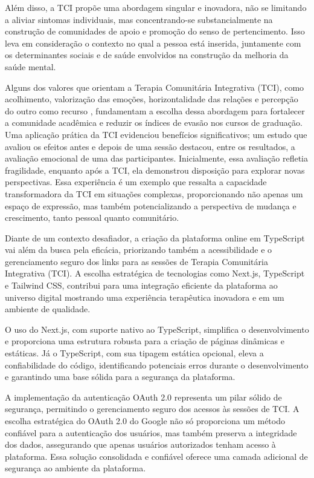 Além disso, a TCI propõe uma abordagem singular e inovadora, não se limitando a aliviar sintomas individuais, mas concentrando-se substancialmente na construção de comunidades de apoio e promoção do senso de pertencimento.\cite{BARRETO} Isso leva em consideração o contexto no qual a pessoa está inserida, juntamente com os determinantes sociais e de saúde envolvidos na construção da melhoria da saúde mental.

Alguns dos valores que orientam a Terapia Comunitária Integrativa (TCI), como acolhimento, valorização das emoções, horizontalidade das relações e percepção do outro como recurso  \cite{SILVA}, fundamentam a escolha dessa abordagem para fortalecer a comunidade acadêmica e reduzir os índices de evasão nos cursos de graduação. Uma aplicação prática da TCI evidenciou benefícios significativos; um estudo que avaliou os efeitos antes e depois de uma sessão destacou, entre os resultados, a avaliação emocional de uma das participantes. Inicialmente, essa avaliação refletia fragilidade, enquanto após a TCI, ela demonstrou disposição para explorar novas perspectivas. \cite{LEITEePALOS} Essa experiência é um exemplo que ressalta a capacidade transformadora da TCI em situações complexas, proporcionando não apenas um espaço de expressão, mas também potencializando a perspectiva de mudança e crescimento, tanto pessoal quanto comunitário.

Diante de um contexto desafiador, a criação da plataforma online em TypeScript vai além da busca pela eficácia, priorizando também a acessibilidade e o gerenciamento seguro dos links para as sessões de Terapia Comunitária Integrativa (TCI). A escolha estratégica de tecnologias como Next.js, TypeScript e Tailwind CSS, contribui para uma integração eficiente da plataforma ao universo digital mostrando uma experiência terapêutica inovadora e em um ambiente de qualidade.

O uso do Next.js, com suporte nativo ao TypeScript, simplifica o desenvolvimento e proporciona uma estrutura robusta para a criação de páginas dinâmicas e estáticas. Já o TypeScript, com sua tipagem estática opcional, eleva a confiabilidade do código, identificando potenciais erros durante o desenvolvimento e garantindo uma base sólida para a segurança da plataforma.

A implementação da autenticação OAuth 2.0 representa um pilar sólido de segurança, permitindo o gerenciamento seguro dos acessos às sessões de TCI. A escolha estratégica do OAuth 2.0 do Google não só proporciona um método confiável para a autenticação dos usuários, mas também preserva a integridade dos dados, assegurando que apenas usuários autorizados tenham acesso à plataforma. Essa solução consolidada e confiável oferece uma camada adicional de segurança ao ambiente da plataforma.

